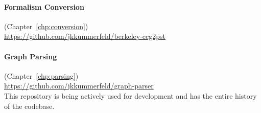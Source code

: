 \paragraph{Formalism Conversion} (Chapter~\ref{chp:conversion}) \\
\url{https://github.com/jkkummerfeld/berkeley-ccg2pst}

\paragraph{Graph Parsing} (Chapter~\ref{chp:parsing}) \\
\url{https://github.com/jkkummerfeld/graph-parser} \\
This repository is being actively used for development and has the entire history of the codebase.



